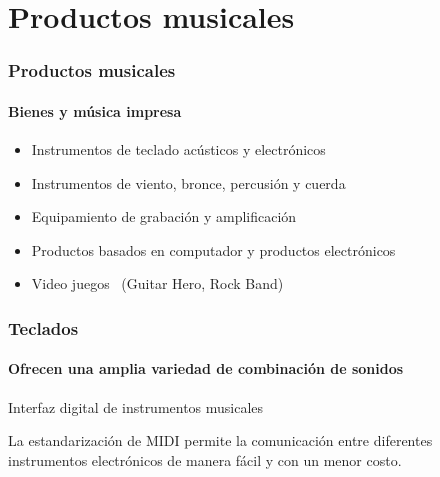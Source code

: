 \documentclass[xcolor=table]{beamer}
\begin{document}
	\section{Productos musicales}
	\begin{frame}
		\frametitle{Productos musicales}
		\framesubtitle{Bienes y música impresa}
		\begin{itemize}
			\item Instrumentos de teclado acústicos y electrónicos
			\item Instrumentos de viento, bronce, percusión y cuerda
			\item Equipamiento de grabación y amplificación
			\item Productos basados en computador y productos electrónicos
			\item Video juegos~\cite{passman2011all} (Guitar Hero, Rock Band)
		\end{itemize}
	\end{frame}
	\begin{frame}
		\frametitle{Teclados}
		\framesubtitle{Ofrecen una amplia variedad de combinación de sonidos}
		\begin{tcolorbox}[colback=white,colframe=udlacolour,title=MIDI]
    			Interfaz digital de instrumentos musicales
    		\end{tcolorbox}
		La estandarización de MIDI permite la comunicación entre diferentes instrumentos electrónicos de manera fácil y con un menor costo.
	\end{frame}
\end{document}
